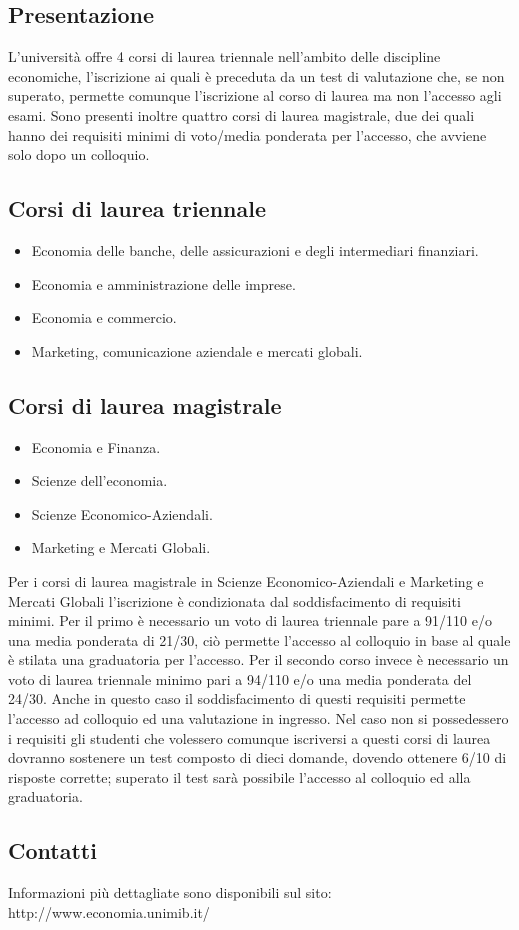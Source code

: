 \subsection{Presentazione}
L'università offre 4 corsi di laurea triennale nell'ambito delle discipline economiche, l'iscrizione ai quali è preceduta da un test di valutazione che, se non superato, permette comunque l'iscrizione al corso di laurea ma non l'accesso agli esami. Sono presenti inoltre quattro corsi di laurea magistrale, due dei quali hanno dei requisiti minimi di voto/media ponderata per l'accesso, che avviene solo dopo un colloquio.
\subsection{Corsi di laurea triennale}
\begin{itemize}
\item Economia delle banche, delle assicurazioni e degli intermediari finanziari. 
\item Economia e amministrazione delle imprese. 
\item Economia e commercio. 
\item Marketing, comunicazione aziendale e mercati globali.
\end{itemize}
\subsection{Corsi di laurea magistrale}
\begin{itemize}
\item Economia e Finanza. 
\item Scienze dell'economia. 
\item Scienze Economico-Aziendali. 
\item Marketing e Mercati Globali.
\end{itemize}
Per i corsi di laurea magistrale in Scienze Economico-Aziendali e Marketing e Mercati Globali l'iscrizione è condizionata dal soddisfacimento di requisiti minimi. Per il primo è necessario un voto di laurea triennale pare a 91/110 e/o una media ponderata di 21/30, ciò permette l'accesso al colloquio in base al quale è stilata una graduatoria per l'accesso. Per il secondo corso invece è necessario un voto di laurea triennale minimo pari a 94/110 e/o una media ponderata del 24/30. Anche in questo caso il soddisfacimento di questi requisiti permette l'accesso ad colloquio ed una valutazione in ingresso. Nel caso non si possedessero i requisiti gli studenti che volessero comunque iscriversi a questi corsi di laurea dovranno sostenere un test composto di dieci domande, dovendo ottenere 6/10 di risposte corrette; superato il test sarà possibile l'accesso al colloquio ed alla graduatoria. 
\subsection{Contatti}
Informazioni più dettagliate sono disponibili sul sito: http://www.economia.unimib.it/ 
